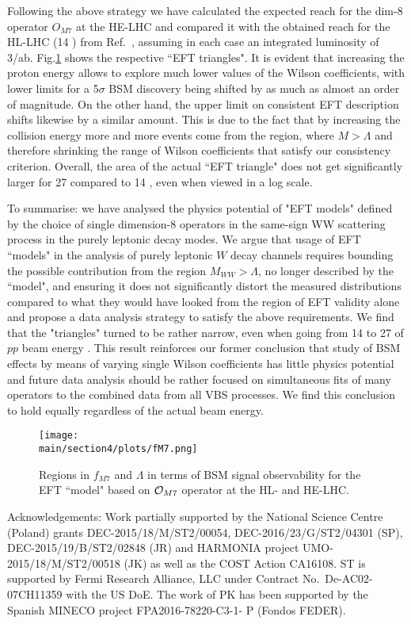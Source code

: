 Following the above strategy we have calculated the expected reach for the dim-8 operator $O_{M7}$ at the HE-LHC and compared it with the obtained reach for the HL-LHC (14 \UTeV) from Ref.~\cite{Kalinowski:2018oxd}, assuming in each case an integrated luminosity of 3/ab.  Fig.\ref{fig:fM7} shows the respective ``EFT triangles".  It is evident that increasing the proton energy allows to explore much lower values of the Wilson coefficients, with lower limits for a 5$\sigma$ BSM discovery being shifted by as much as almost an order of magnitude.  On the other hand, the upper limit on consistent EFT description shifts likewise by a similar amount. This is due to the fact that by increasing the collision energy more and more events come from the region, where $M>\Lambda$ and therefore shrinking the range of Wilson coefficients that satisfy our consistency criterion.  Overall, the area of the actual ``EFT triangle" does not get significantly larger for 27 \UTeV compared to 14 \UTeV, even when viewed in a log scale.  

To summarise:  we have analysed the physics potential of "EFT models" defined by the choice of single dimension-8 operators in the same-sign WW scattering process in the purely leptonic decay modes.  
We argue that usage of EFT ``models" in the analysis of purely
leptonic $W$ decay channels requires bounding the possible contribution from
the region $M_{WW} > \Lambda$, no longer described by the ``model",
and ensuring it does not significantly distort the measured distributions 
compared to what they would have looked from the region of EFT validity alone and 
propose a data analysis strategy to satisfy the above requirements.  
We find that the "triangles"  turned to be rather narrow, even when going from 14 to 27 \UTeV of $pp$ beam energy . This result reinforces our former conclusion that study of BSM effects by means of varying single Wilson coefficients has little physics potential and future data analysis should be rather focused on simultaneous fits of many operators to the combined data from all VBS processes.  We find this conclusion to hold equally regardless of the actual beam energy.




\begin{figure}
\centering
\texttt{[image: \\main/section4/plots/fM7.png]}
\caption{
Regions in $f_{M7}$ and $\Lambda$ in terms of BSM signal observability
for the EFT ``model"  based on ${\cal O}_{M7}$ operator at the HL- and HE-LHC.}
\label{fig:fM7}
\end{figure}




%
Acknowledgements: 
Work partially supported by the National Science Centre (Poland) grants
DEC-2015/18/M/ST2/00054,  DEC-2016/23/G/ST2/04301 (SP),
DEC-2015/19/B/ST2/02848 (JR) and 
HARMONIA project 
UMO-2015/18/M/ST2/00518  (JK) as well as the COST Action CA16108. 
ST is supported by Fermi Research Alliance, LLC under Contract No.~De-AC02-07CH11359 with the US DoE. The work of PK  has been supported by the Spanish MINECO project FPA2016-78220-C3-1- P (Fondos FEDER).
